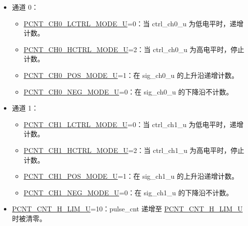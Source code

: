 \documentclass[main\_\_CN.tex]{subfiles}
\begin{document}
\begin{itemize}
    \item 通道 0：
    \begin{itemize}
        \item \hyperref[fielddesc:PCNTCH0LCTRLMODEUN]{PCNT\_CH0\_LCTRL\_MODE\_U}=0：当 ctrl\_ch0\_u 为低电平时，递增计数。
        \item \hyperref[fielddesc:PCNTCH0HCTRLMODEUN]{PCNT\_CH0\_HCTRL\_MODE\_U}=2：当 ctrl\_ch0\_u 为高电平时，停止计数。
        \item \hyperref[fielddesc:PCNTCH0POSMODEUN]{PCNT\_CH0\_POS\_MODE\_U}=1：在 sig\_ch0\_u 的上升沿递增计数。
        \item \hyperref[fielddesc:PCNTCH0NEGMODEUN]{PCNT\_CH0\_NEG\_MODE\_U}=0：在 sig\_ch0\_u 的下降沿不计数。

    \end{itemize}

    \item 通道 1：
    \begin{itemize}
        \item \hyperref[fielddesc:PCNTCH1LCTRLMODEUN]{PCNT\_CH1\_LCTRL\_MODE\_U}=0：当 ctrl\_ch1\_u 为低电平时，递增计数。

        \item \hyperref[fielddesc:PCNTCH1HCTRLMODEUN]{PCNT\_CH1\_HCTRL\_MODE\_U}=2：当 ctrl\_ch1\_u 为高电平时，停止计数。

        \item \hyperref[fielddesc:PCNTCH1POSMODEUN]{PCNT\_CH1\_POS\_MODE\_U}=1：在 sig\_ch1\_u 的上升沿递增计数。

        \item \hyperref[fielddesc:PCNTCH1NEGMODEUN]{PCNT\_CH1\_NEG\_MODE\_U}=0：在 sig\_ch1\_u 的下降沿不计数。

    \end{itemize}
    \item \hyperref[fielddesc:PCNTCNTHLIMUN]{PCNT\_CNT\_H\_LIM\_U}=10：pulse\_cnt 递增至 \hyperref[fielddesc:PCNTCNTHLIMUN]{PCNT\_CNT\_H\_LIM\_U} 时被清零。

\end{itemize}


\end{document}
